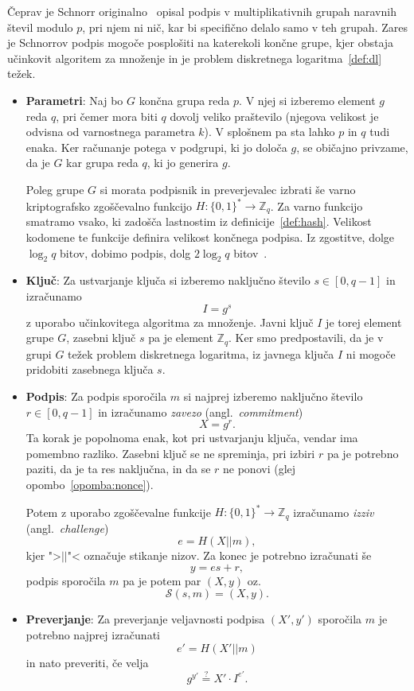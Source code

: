 \documentclass[isrm2, tisk]{fmfdelo}
\newcommand{\Z}{\mathbb Z}
\begin{document}
Čeprav je Schnorr originalno~\cite{schnorr1989sig} opisal podpis v multiplikativnih grupah naravnih
števil modulo $p$, pri njem ni nič, kar bi specifično delalo samo v teh grupah. Zares
je Schnorrov podpis mogoče posplošiti na katerekoli končne grupe, kjer obstaja učinkovit algoritem
za množenje in je problem diskretnega logaritma~\ref{def:dl} težek.
\begin{itemize}
    \item \textbf{Parametri}:
    Naj bo $G$ končna grupa reda $p$. V njej si izberemo element $g$ reda $q$, pri čemer mora
    biti $q$ dovolj veliko praštevilo (njegova velikost je odvisna od varnostnega parametra $k$).
    V splošnem pa sta lahko $p$ in $q$ tudi enaka. Ker računanje potega v podgrupi, ki jo določa $g$,
    se običajno privzame, da je $G$ kar grupa reda $q$, ki jo generira $g$.

    Poleg grupe $G$ si morata podpisnik in preverjevalec izbrati še varno kriptografsko zgoščevalno
    funkcijo $H : \{0, 1\}^* \rightarrow \Z_q$. Za varno funkcijo smatramo vsako, 
    ki zadošča lastnostim iz definicije~\ref{def:hash}. Velikost kodomene te funkcije definira velikost 
    končnega podpisa. Iz zgostitve, dolge $\log_2 q$ bitov, dobimo podpis, dolg $2 \log_2 q$ bitov~\cite{
    stinson2023crypto}.
    \item \textbf{Ključ}:
    Za ustvarjanje ključa si izberemo naključno število $s \in [0, q - 1]$ in izračunamo
    $$
    I = g^s
    $$
    z uporabo učinkovitega algoritma za množenje. Javni ključ $I$ je torej element grupe $G$, zasebni ključ
    $s$ pa je element $\Z_q$. Ker smo predpostavili, da je v grupi $G$ težek problem diskretnega logaritma,
    iz javnega ključa $I$ ni mogoče pridobiti zasebnega ključa $s$.

    \item \textbf{Podpis}:
    Za podpis sporočila $m$ si najprej izberemo naključno število $r \in [0, q - 1]$ in izračunamo
    \textit{zavezo} (angl.\ \textit{commitment})
    $$
    X = g^r.
    $$
    Ta korak je popolnoma enak, kot pri ustvarjanju ključa, vendar ima pomembno razliko. Zasebni
    ključ se ne spreminja, pri izbiri $r$ pa je potrebno paziti, da je ta res naključna, in da se
    $r$ ne ponovi (glej opombo~\ref{opomba:nonce}).

    Potem z uporabo zgoščevalne funkcije $H : \{0, 1\}^* \rightarrow \Z_q$ izračunamo \textit{izziv}
    (angl.\ \textit{challenge})
    $$
    e = H(X || m),
    $$
    kjer ">$||$"< označuje stikanje nizov. Za konec je potrebno izračunati še 
    $$ 
    y = es + r, 
    $$
    podpis sporočila $m$ pa je potem par $(X, y)$ oz.\ 
    $$ 
    \mathcal{S}(s, m) = (X, y).
    $$

    \item \textbf{Preverjanje}:
    Za preverjanje veljavnosti podpisa $(X', y')$ sporočila $m$ je potrebno najprej izračunati
    $$
    e' = H(X' || m)
    $$
    in nato preveriti, če velja
    $$
    g^{y'} \stackrel{?}{=} X' \cdot I^{e'}.
    $$
\end{itemize}
\end{document}

